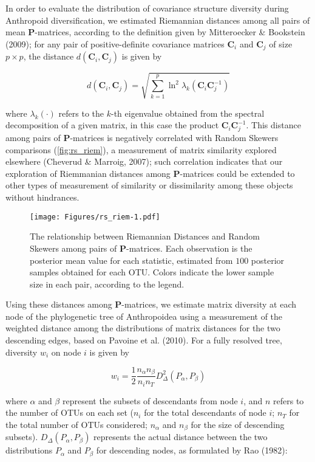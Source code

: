 \documentclass[12pt,twoside]{report}
\begin{document}
In order to evaluate the distribution of covariance structure diversity
during Anthropoid diversification, we estimated Riemannian distances
among all pairs of mean $\mathbf{P}$-matrices, according to the
definition given by Mitteroecker \& Bookstein (2009); for any pair of
positive-definite covariance matrices $\mathbf{C}_i$ and $\mathbf{C}_j$
of size $p \times p$, the distance $d(\mathbf{C}_i, \mathbf{C}_j)$ is
given by

\begin{equation}
d(\mathbf{C}_i, \mathbf{C}_j) = \sqrt{\sum_{k = 1}^p \ln^2 \lambda_k(\mathbf{C}_i\mathbf{C}_j^{-1})}
\label{eq:riemdist}
\end{equation}

where $\lambda_k(\cdot)$ refers to the $k$-th eigenvalue obtained from
the spectral decomposition of a given matrix, in this case the product
$\mathbf{C}_i\mathbf{C}_j^{-1}$. This distance among pairs of
$\mathbf{P}$-matrices is negatively correlated with Random Skewers
comparisons (\autoref{fig:rs_riem}), a measurement of matrix similarity
explored elsewhere (Cheverud \& Marroig, 2007); such correlation
indicates that our exploration of Riemmanian distances among
$\mathbf{P}$-matrices could be extended to other types of measurement of
similarity or dissimilarity among these objects without hindrances.

\begin{figure}[htbp]
\centering
\texttt{[image: Figures/rs\_riem-1.pdf]}
\caption{The relationship between Riemannian Distances and Random
Skewers among pairs of $\mathbf{P}$-matrices. Each observation is the
posterior mean value for each statistic, estimated from $100$ posterior
samples obtained for each OTU. Colors indicate the lower sample size in
each pair, according to the legend. \label{fig:rs_riem}}
\end{figure}

Using these distances among $\mathbf{P}$-matrices, we estimate matrix
diversity at each node of the phylogenetic tree of Anthropoidea using a
measurement of the weighted distance among the distributions of matrix
distances for the two descending edges, based on Pavoine et al. (2010).
For a fully resolved tree, diversity $w_i$ on node $i$ is given by

\begin{equation}
w_i = \frac{1}{2} \frac{n_\alpha n_\beta} {n_i n_T} D_{\Delta}^2(P_\alpha, P_\beta)
\label{eq:div}
\end{equation}

where $\alpha$ and $\beta$ represent the subsets of descendants from
node $i$, and $n$ refers to the number of OTUs on each set ($n_i$ for
the total descendants of node $i$; $n_T$ for the total number of OTUs
considered; $n_\alpha$ and $n_\beta$ for the size of descending
subsets). $D_{\Delta}(P_\alpha, P_\beta)$ represents the actual distance
between the two distributions $P_\alpha$ and $P_\beta$ for descending
nodes, as formulated by Rao (1982):
\end{document}

